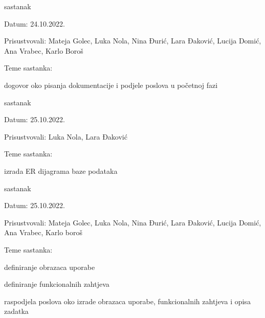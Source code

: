 \begin{packed_enum}
			\item  sastanak
			\item[] \begin{packed_item}
				\item Datum:  24.10.2022.
				\item Prisustvovali: Mateja Golec, Luka Nola, Nina Đurić, Lara Đaković, Lucija Domić, Ana Vrabec, Karlo Boroš
				\item Teme sastanka:
				\begin{packed_item}
					\item  dogovor oko pisanja dokumentacije i podjele poslova u početnoj fazi
				\end{packed_item}
			\end{packed_item}
			
			\item  sastanak
			\item[] \begin{packed_item}
				\item Datum:  25.10.2022.
				\item Prisustvovali: Luka Nola, Lara Đaković
				\item Teme sastanka:
				\begin{packed_item}
					\item  izrada ER dijagrama baze podataka
				\end{packed_item}
			\end{packed_item}

			\item  sastanak
			\item[] \begin{packed_item}
				\item Datum: 25.10.2022.
				\item Prisustvovali: Mateja Golec, Luka Nola, Nina Đurić, Lara Đaković, Lucija Domić, Ana Vrabec, Karlo boroš
				\item Teme sastanka:
				\begin{packed_item}
					\item  definiranje obrazaca uporabe
					\item  definiranje funkcionalnih zahtjeva
					\item  raspodjela poslova oko izrade obrazaca uporabe, funkcionalnih zahtjeva i opisa zadatka
				\end{packed_item}
			\end{packed_item}


\end{packed_enum}
